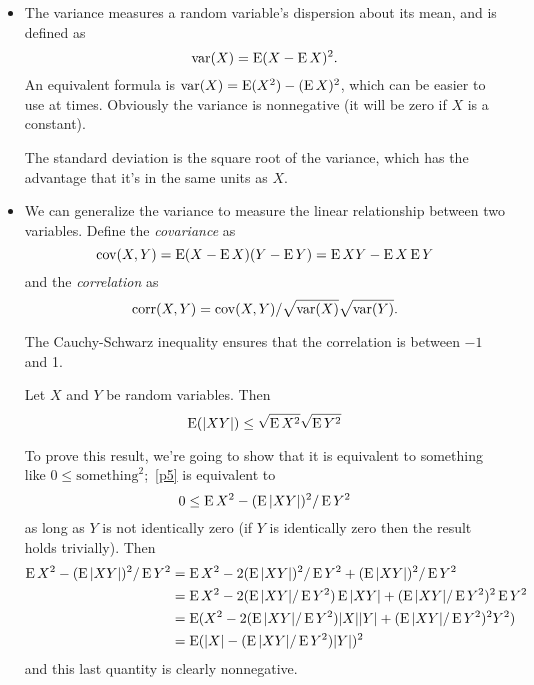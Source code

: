 \begin{itemize}

\item The variance measures a random variable's dispersion about its
  mean, and is defined as
  \begin{equation*}
    \operatorname{var}(X) = \operatorname{E}(X - \operatorname{E} X)^2.
  \end{equation*}
  An equivalent formula is $\operatorname{var}(X) = \operatorname{E}(X^2) - (\operatorname{E} X)^2$, which can be
  easier to use at times.  Obviously the variance is nonnegative (it
  will be zero if $X$ is a constant).

  The standard deviation is the square root of the variance, which has
  the advantage that it's in the same units as $X$.

\item We can generalize the variance to measure the linear
  relationship between two variables.  Define the \emph{covariance} as
  \begin{equation*}
    \operatorname{cov}(X,Y) = \operatorname{E}(X - \operatorname{E} X) (Y - \operatorname{E} Y) = \operatorname{E} XY - \operatorname{E} X \operatorname{E} Y
  \end{equation*}
  and the \emph{correlation} as
  \begin{equation*}
    \operatorname{corr}(X, Y) = \operatorname{cov}(X,Y) / \sqrt{\operatorname{var}(X)} \sqrt{\operatorname{var}(Y)}.
  \end{equation*}

  The Cauchy-Schwarz inequality ensures that the correlation is
  between $-1$ and 1.
  \begin{thm}
    Let $X$ and $Y$ be random variables.  Then 
    \begin{equation}\label{p5}
      \E (|X Y|) \leq \sqrt{\E X^2} \sqrt{\E Y^2}
    \end{equation}
  \end{thm}
  To prove this result, we're going to show that it is equivalent to
  something like $0 \leq \text{something}^2$;~\eqref{p5} is equivalent to
  \begin{equation*}
    0 \leq \operatorname{E} X^2 - (\operatorname{E} |X Y|)^2 / \operatorname{E} Y^2
  \end{equation*}
  as long as $Y$ is not identically zero (if $Y$ is identically zero
  then the result holds trivially).  Then
  \begin{align*}
    \operatorname{E} X^2 - (\operatorname{E} |X Y|)^2 / \operatorname{E} Y^2
    &= \operatorname{E} X^2 - 2 (\operatorname{E} |XY|)^2/ \operatorname{E} Y^2 + (\operatorname{E} |XY|)^2/ \operatorname{E} Y^2 \\
    &= \operatorname{E} X^2 - 2(\operatorname{E} |XY| / \operatorname{E} Y^2) \operatorname{E} |XY| + (\operatorname{E} |XY|/\operatorname{E} Y^2)^2 \operatorname{E} Y^2 \\
    &= \operatorname{E}(X^2 - 2(\operatorname{E} |XY| / \operatorname{E} Y^2) |X| |Y| + (\operatorname{E} |XY|/\operatorname{E} Y^2)^2 Y^2) \\
    &= \operatorname{E}(|X| - (\operatorname{E} |XY|/\operatorname{E} Y^2) |Y|)^2
  \end{align*}
  and this last quantity is clearly nonnegative.


\end{itemize}
